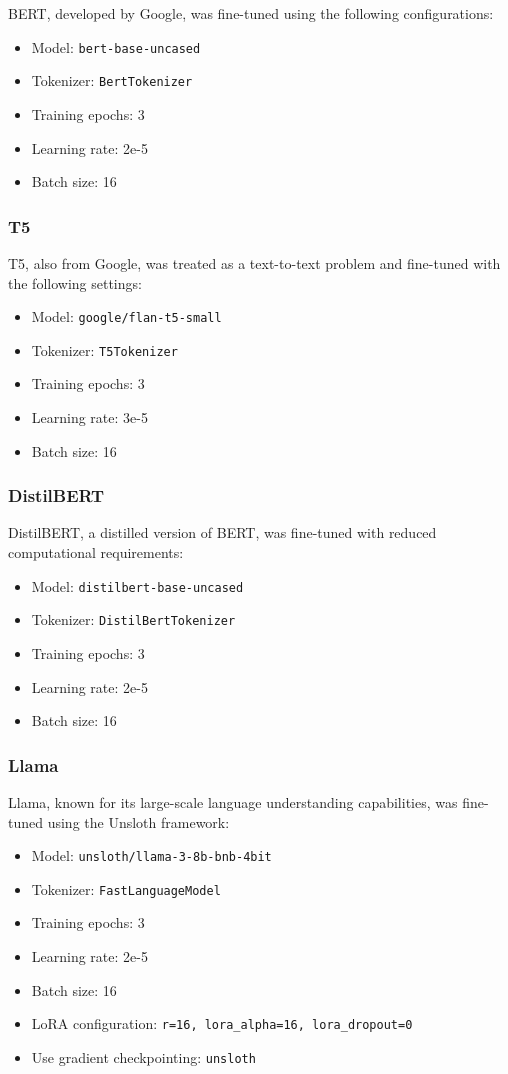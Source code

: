 \documentclass[conference]{IEEEtran}
\begin{document}
BERT, developed by Google, was fine-tuned using the following configurations:
\begin{itemize}
    \item Model: \texttt{bert-base-uncased}
    \item Tokenizer: \texttt{BertTokenizer}
    \item Training epochs: 3
    \item Learning rate: 2e-5
    \item Batch size: 16
\end{itemize}

\subsubsection{T5}

T5, also from Google, was treated as a text-to-text problem and fine-tuned with the following settings:
\begin{itemize}
    \item Model: \texttt{google/flan-t5-small}
    \item Tokenizer: \texttt{T5Tokenizer}
    \item Training epochs: 3
    \item Learning rate: 3e-5
    \item Batch size: 16
\end{itemize}

\subsubsection{DistilBERT}

DistilBERT, a distilled version of BERT, was fine-tuned with reduced computational requirements:
\begin{itemize}
    \item Model: \texttt{distilbert-base-uncased}
    \item Tokenizer: \texttt{DistilBertTokenizer}
    \item Training epochs: 3
    \item Learning rate: 2e-5
    \item Batch size: 16
\end{itemize}

\subsubsection{Llama}

Llama, known for its large-scale language understanding capabilities, was fine-tuned using the Unsloth framework:
\begin{itemize}
    \item Model: \texttt{unsloth/llama-3-8b-bnb-4bit}
    \item Tokenizer: \texttt{FastLanguageModel}
    \item Training epochs: 3
    \item Learning rate: 2e-5
    \item Batch size: 16
    \item LoRA configuration: \texttt{r=16, lora\_alpha=16, lora\_dropout=0}
    \item Use gradient checkpointing: \texttt{unsloth}
\end{itemize}
\end{document}
